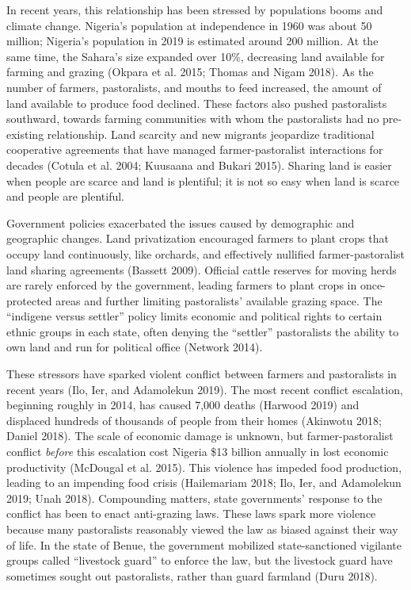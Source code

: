 \documentclass[11pt]{article}
\begin{document}
In recent years, this relationship has been stressed by populations
booms and climate change. Nigeria's population at independence in 1960
was about 50 million; Nigeria's population in 2019 is estimated around
200 million. At the same time, the Sahara's size expanded over 10\%,
decreasing land available for farming and grazing (Okpara et al. 2015;
Thomas and Nigam 2018). As the number of farmers, pastoralists, and
mouths to feed increased, the amount of land available to produce food
declined. These factors also pushed pastoralists southward, towards
farming communities with whom the pastoralists had no pre-existing
relationship. Land scarcity and new migrants jeopardize traditional
cooperative agreements that have managed farmer-pastoralist interactions
for decades (Cotula et al. 2004; Kuusaana and Bukari 2015). Sharing land
is easier when people are scarce and land is plentiful; it is not so
easy when land is scarce and people are plentiful.

Government policies exacerbated the issues caused by demographic and
geographic changes. Land privatization encouraged farmers to plant crops
that occupy land continuously, like orchards, and effectively nullified
farmer-pastoralist land sharing agreements (Bassett 2009). Official
cattle reserves for moving herds are rarely enforced by the government,
leading farmers to plant crops in once-protected areas and further
limiting pastoralists' available grazing space. The ``indigene versus
settler'' policy limits economic and political rights to certain ethnic
groups in each state, often denying the ``settler'' pastoralists the
ability to own land and run for political office (Network 2014).

These stressors have sparked violent conflict between farmers and
pastoralists in recent years (Ilo, Ier, and Adamolekun 2019). The most
recent conflict escalation, beginning roughly in 2014, has caused 7,000
deaths (Harwood 2019) and displaced hundreds of thousands of people from
their homes (Akinwotu 2018; Daniel 2018). The scale of economic damage
is unknown, but farmer-pastoralist conflict \emph{before} this
escalation cost Nigeria \$13 billion annually in lost economic
productivity (McDougal et al. 2015). This violence has impeded food
production, leading to an impending food crisis (Hailemariam 2018; Ilo,
Ier, and Adamolekun 2019; Unah 2018). Compounding matters, state
governments' response to the conflict has been to enact anti-grazing
laws. These laws spark more violence because many pastoralists
reasonably viewed the law as biased against their way of life. In the
state of Benue, the government mobilized state-sanctioned vigilante
groups called ``livestock guard'' to enforce the law, but the livestock
guard have sometimes sought out pastoralists, rather than guard farmland
(Duru 2018).
\end{document}
